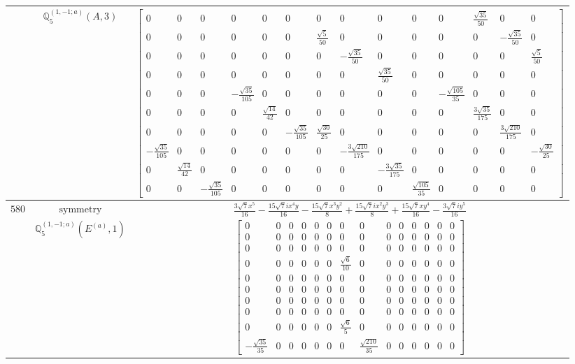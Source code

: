 \documentclass[fleqn,8pt,landscape]{jsarticle}
\begin{document}
\begin{longtable}{ccc}
$  $ & $ \mathbb{Q}_{5}^{(1,-1;a)}(A,3) $ & $ \begin{bmatrix} 0 & 0 & 0 & 0 & 0 & 0 & 0 & 0 & 0 & 0 & 0 & \frac{\sqrt{35}}{50} & 0 & 0 \\ 0 & 0 & 0 & 0 & 0 & 0 & \frac{\sqrt{5}}{50} & 0 & 0 & 0 & 0 & 0 & - \frac{\sqrt{35}}{50} & 0 \\ 0 & 0 & 0 & 0 & 0 & 0 & 0 & - \frac{\sqrt{35}}{50} & 0 & 0 & 0 & 0 & 0 & \frac{\sqrt{5}}{50} \\ 0 & 0 & 0 & 0 & 0 & 0 & 0 & 0 & \frac{\sqrt{35}}{50} & 0 & 0 & 0 & 0 & 0 \\ 0 & 0 & 0 & - \frac{\sqrt{35}}{105} & 0 & 0 & 0 & 0 & 0 & 0 & - \frac{\sqrt{105}}{35} & 0 & 0 & 0 \\ 0 & 0 & 0 & 0 & \frac{\sqrt{14}}{42} & 0 & 0 & 0 & 0 & 0 & 0 & \frac{3 \sqrt{35}}{175} & 0 & 0 \\ 0 & 0 & 0 & 0 & 0 & - \frac{\sqrt{35}}{105} & \frac{\sqrt{30}}{25} & 0 & 0 & 0 & 0 & 0 & \frac{3 \sqrt{210}}{175} & 0 \\ - \frac{\sqrt{35}}{105} & 0 & 0 & 0 & 0 & 0 & 0 & - \frac{3 \sqrt{210}}{175} & 0 & 0 & 0 & 0 & 0 & - \frac{\sqrt{30}}{25} \\ 0 & \frac{\sqrt{14}}{42} & 0 & 0 & 0 & 0 & 0 & 0 & - \frac{3 \sqrt{35}}{175} & 0 & 0 & 0 & 0 & 0 \\ 0 & 0 & - \frac{\sqrt{35}}{105} & 0 & 0 & 0 & 0 & 0 & 0 & \frac{\sqrt{105}}{35} & 0 & 0 & 0 & 0 \end{bmatrix} $ \\ \hline
$ 580 $ & $ \text{symmetry} $ & $ \frac{3 \sqrt{7} x^{5}}{16} - \frac{15 \sqrt{7} i x^{4} y}{16} - \frac{15 \sqrt{7} x^{3} y^{2}}{8} + \frac{15 \sqrt{7} i x^{2} y^{3}}{8} + \frac{15 \sqrt{7} x y^{4}}{16} - \frac{3 \sqrt{7} i y^{5}}{16} $ \\
$  $ & $ \mathbb{Q}_{5}^{(1,-1;a)}(E^{(a)},1) $ & $ \begin{bmatrix} 0 & 0 & 0 & 0 & 0 & 0 & 0 & 0 & 0 & 0 & 0 & 0 & 0 & 0 \\ 0 & 0 & 0 & 0 & 0 & 0 & 0 & 0 & 0 & 0 & 0 & 0 & 0 & 0 \\ 0 & 0 & 0 & 0 & 0 & 0 & 0 & 0 & 0 & 0 & 0 & 0 & 0 & 0 \\ 0 & 0 & 0 & 0 & 0 & 0 & \frac{\sqrt{6}}{10} & 0 & 0 & 0 & 0 & 0 & 0 & 0 \\ 0 & 0 & 0 & 0 & 0 & 0 & 0 & 0 & 0 & 0 & 0 & 0 & 0 & 0 \\ 0 & 0 & 0 & 0 & 0 & 0 & 0 & 0 & 0 & 0 & 0 & 0 & 0 & 0 \\ 0 & 0 & 0 & 0 & 0 & 0 & 0 & 0 & 0 & 0 & 0 & 0 & 0 & 0 \\ 0 & 0 & 0 & 0 & 0 & 0 & 0 & 0 & 0 & 0 & 0 & 0 & 0 & 0 \\ 0 & 0 & 0 & 0 & 0 & 0 & \frac{\sqrt{6}}{5} & 0 & 0 & 0 & 0 & 0 & 0 & 0 \\ - \frac{\sqrt{35}}{35} & 0 & 0 & 0 & 0 & 0 & 0 & \frac{\sqrt{210}}{35} & 0 & 0 & 0 & 0 & 0 & 0 \end{bmatrix} $ \\ \hline

\end{longtable}
\end{document}
